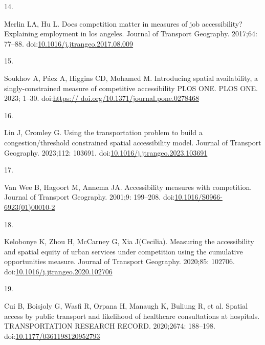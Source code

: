 \documentclass[10pt,letterpaper]{article}
\newlength{\cslhangindent}
\newlength{\csllabelwidth}
\newlength{\cslentryspacingunit} %
\newenvironment{CSLReferences}[2] %
 {%
  \setlength{\parindent}{0pt}
  \ifodd #1
  \let\oldpar\par
  \def\par{\hangindent=\cslhangindent\oldpar}
  \fi
  \setlength{\parskip}{#2\cslentryspacingunit}
 }%
 {}
\newcommand{\CSLLeftMargin}[1]{\parbox[t]{\csllabelwidth}{#1}}
\newcommand{\CSLRightInline}[1]{\parbox[t]{\linewidth - \csllabelwidth}{#1}\break}
\begin{document}
\begin{CSLReferences}{0}{0}
\leavevmode{}%
\CSLLeftMargin{14. }%
\CSLRightInline{Merlin LA, Hu L. Does competition matter in measures of
job accessibility? Explaining employment in los angeles. Journal of
Transport Geography. 2017;64: 77--88.
doi:\href{https://doi.org/10.1016/j.jtrangeo.2017.08.009}{10.1016/j.jtrangeo.2017.08.009}}

\leavevmode{}%
\CSLLeftMargin{15. }%
\CSLRightInline{Soukhov A, Páez A, Higgins CD, Mohamed M. Introducing
spatial availability, a singly-constrained measure of competitive
accessibility \textbar{} {PLOS ONE}. PLOS ONE. 2023; 1--30.
doi:\href{https://\%20doi.org/10.1371/journal.pone.0278468}{https://
doi.org/10.1371/journal.pone.0278468}}

\leavevmode{}%
\CSLLeftMargin{16. }%
\CSLRightInline{Lin J, Cromley G. Using the transportation problem to
build a congestion/threshold constrained spatial accessibility model.
Journal of Transport Geography. 2023;112: 103691.
doi:\href{https://doi.org/10.1016/j.jtrangeo.2023.103691}{10.1016/j.jtrangeo.2023.103691}}

\leavevmode{}%
\CSLLeftMargin{17. }%
\CSLRightInline{Van Wee B, Hagoort M, Annema JA. Accessibility measures
with competition. Journal of Transport Geography. 2001;9: 199--208.
doi:\href{https://doi.org/10.1016/S0966-6923(01)00010-2}{10.1016/S0966-6923(01)00010-2}}

\leavevmode{}%
\CSLLeftMargin{18. }%
\CSLRightInline{Kelobonye K, Zhou H, McCarney G, Xia J(Cecilia).
Measuring the accessibility and spatial equity of urban services under
competition using the cumulative opportunities measure. Journal of
Transport Geography. 2020;85: 102706.
doi:\href{https://doi.org/10.1016/j.jtrangeo.2020.102706}{10.1016/j.jtrangeo.2020.102706}}

\leavevmode{}%
\CSLLeftMargin{19. }%
\CSLRightInline{Cui B, Boisjoly G, Wasfi R, Orpana H, Manaugh K, Buliung
R, et al. Spatial access by public transport and likelihood of
healthcare consultations at hospitals. {TRANSPORTATION} {RESEARCH}
{RECORD}. 2020;2674: 188--198.
doi:\href{https://doi.org/10.1177/0361198120952793}{10.1177/0361198120952793}}


\end{CSLReferences}
\end{document}
